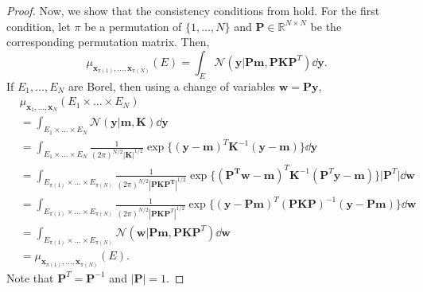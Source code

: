 \begin{proof}
    Now, we show that the consistency conditions from hold.
    For the first condition, let $\pi$ be a permutation of $\{ 1, \dots, N \}$ and $\mathbf{P} \in \mathbb{R}^{N \times N}$ be the corresponding permutation matrix.
    Then,
    \begin{equation*}
        \mu_{\mathbf{x}_{\pi(1)}, \dots, \mathbf{x}_{\pi(N)}}(E) =
        \int_{E} \mathcal{N}(\mathbf{y} | \mathbf{Pm}, \mathbf{P} \mathbf{K} \mathbf{P}^{T}) \dd \mathbf{y}.
    \end{equation*}
    If $E_1, \dots, E_N$ are Borel, then using a change of variables $\mathbf{w} = \mathbf{Py}$,
    \begin{align*}
        & \mu_{\mathbf{x}_1, \dots, \mathbf{x}_N}(E_1 \times \dots \times E_N) \\
        & = \int_{E_1 \times \dots \times E_N} \mathcal{N}(\mathbf{y} | \mathbf{m}, \mathbf{K}) \dd \mathbf{y} \\
        & = \int_{E_1 \times \dots \times E_N}
        \frac{ 1 }{ (2 \pi)^{N/2} \lvert \mathbf{K} \rvert^{1/2} }
        \exp \{ (\mathbf{y} - \mathbf{m})^{T} \mathbf{K}^{-1} (\mathbf{y} - \mathbf{m}) \}
        \dd \mathbf{y} \\
        & = \int_{E_{\pi(1)} \times \dots \times E_{\pi(N)}}
        \frac{ 1 }{ (2 \pi)^{N/2} \left\lvert \mathbf{PKP^T} \right\rvert^{1/2} }
        \exp \{ \left(\mathbf{P^Tw} - \mathbf{m}\right)^{T} \mathbf{K}^{-1} (\mathbf{P}^{T}\mathbf{y} - \mathbf{m}) \}
        \lvert \mathbf{P}^{T} \rvert \dd \mathbf{w} \\
        & = \int_{E_{\pi(1)} \times \dots \times E_{\pi(N)}}
        \frac{ 1 }{ (2 \pi)^{N/2} \left\lvert \mathbf{PKP}^T \right\rvert^{1/2} }
        \exp \{ (\mathbf{y} - \mathbf{Pm})^{T} (\mathbf{P}\mathbf{K} \mathbf{P})^{-1} (\mathbf{y} - \mathbf{P}\mathbf{m}) \} \dd \mathbf{w} \\
        & = \int_{E_{\pi(1)} \times \dots \times E_{\pi(N)}}
        \mathcal{N}(\mathbf{w} | \mathbf{Pm}, \mathbf{P} \mathbf{K} \mathbf{P}^{T}) \dd \mathbf{w} \\
        & = \mu_{\mathbf{x}_{\pi(1)}, \dots, \mathbf{x}_{\pi(N)}}(E).
    \end{align*}
    Note that $\mathbf{P}^{T} = \mathbf{P}^{-1}$ and $\lvert \mathbf{P} \rvert = 1$.


\end{proof}
